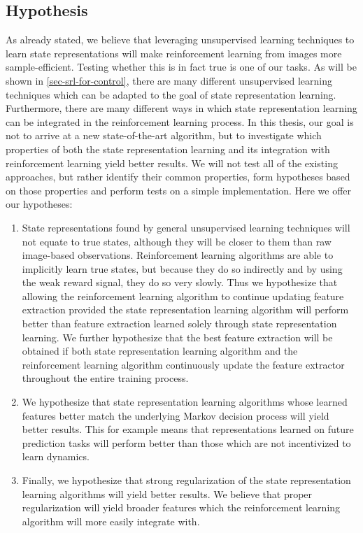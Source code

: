 \subsection{Hypothesis}
\label{subsec-hypothesis}
As already stated, we believe that leveraging unsupervised learning techniques
to learn state representations will make reinforcement learning from images
more sample-efficient.
Testing whether this is in fact true is one of our tasks.
As will be shown in \ref{sec-srl-for-control}, there are many different unsupervised learning
techniques which can be adapted to the goal of state representation learning.
Furthermore, there are many different ways in which state representation learning can be integrated
in the reinforcement learning process.
In this thesis, our goal is not to arrive at a new state-of-the-art algorithm,
but to investigate which properties of both the state representation learning and its integration
with reinforcement learning yield better results.
We will not test all of the existing approaches, but rather identify their common properties,
form hypotheses based on those properties and perform tests on a simple implementation.
Here we offer our hypotheses:
\begin{enumerate}
		\item State representations found by general unsupervised learning techniques 
		will not equate to true states, although they will be closer to them than
		raw image-based observations. Reinforcement learning algorithms are able
		to implicitly learn true states, but because they do so indirectly and by using
		the weak reward signal, they do so very slowly.
		Thus we hypothesize that allowing the reinforcement learning algorithm to continue updating
		feature extraction provided the state representation learning algorithm will perform better
		than feature extraction learned solely through state representation learning.
		We further hypothesize that the best feature extraction will be obtained if both
		state representation learning algorithm and the reinforcement learning algorithm 
		continuously update the feature extractor throughout the entire training process.
		\label{parallel-training-hypothesis}
\item We hypothesize that state representation learning algorithms whose learned features better match the underlying
		Markov decision process will yield better results.
		This for example means that representations learned on future prediction tasks will
		perform better than those which are not incentivized to learn dynamics.
		\label{good-features-hypothesis}
\item Finally, we hypothesize that strong regularization of the state representation learning
		algorithms will yield better results. We believe that proper regularization will
		yield broader features which the reinforcement learning algorithm will 
		more easily integrate with.
		\label{regularization-hypothesis}
\end{enumerate}




